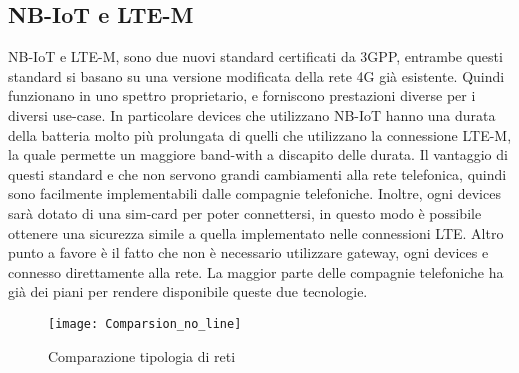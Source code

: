\subsection{NB-IoT e LTE-M}
NB-IoT e LTE-M, sono due nuovi standard certificati da 3GPP, entrambe questi
standard si basano su una versione modificata della rete 4G già esistente.
Quindi funzionano in uno spettro proprietario, e forniscono prestazioni diverse
per i diversi use-case. In particolare devices che utilizzano NB-IoT hanno una
durata della batteria molto più prolungata di quelli che utilizzano la
connessione LTE-M, la quale permette un maggiore band-with a discapito delle
durata. Il vantaggio di questi standard e che non servono grandi cambiamenti
alla rete telefonica, quindi sono facilmente implementabili dalle compagnie
telefoniche. Inoltre, ogni devices sarà dotato di una sim-card per poter
connettersi, in questo modo è possibile ottenere  una sicurezza simile a quella
implementato nelle connessioni LTE.
Altro punto a favore è il fatto che non è necessario utilizzare gateway, ogni
devices e connesso direttamente alla rete. 
La maggior parte delle compagnie telefoniche ha già dei piani per rendere disponibile queste due
tecnologie.

\begin{figure}[h]
        \centering 
                \texttt{[image: Comparsion\_no\_line]}
        \caption{Comparazione tipologia di reti}
\end{figure}
